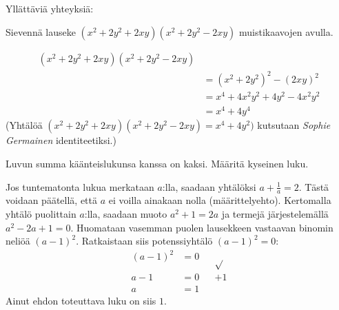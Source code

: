 \begin{tehtavasivu}
\begin{tehtava} 
	Yllättäviä yhteyksiä:

    \begin{vastaus}
    \end{vastaus}
\end{tehtava}

\begin{tehtava}
Sievennä lauseke $(x^2+2y^2+2xy)(x^2+2y^2-2xy)$ muistikaavojen avulla.
	\begin{vastaus}
	\begin{align*}
		(x^2+2y^2+2xy)(x^2+2y^2-2xy) \\
		&=(x^2+2y^2)^2-(2xy)^2 \\
		&=x^4+4x^2y^2+4y^2-4x^2y^2 \\
		&=x^4+4y^4
	\end{align*}		
	(Yhtälöä $(x^2+2y^2+2xy)(x^2+2y^2-2xy)=x^4+4y^2)$ kutsutaan \textit{Sophie Germainen} identiteetiksi.)
	\end{vastaus}
\end{tehtava}

\begin{tehtava}
Luvun summa käänteislukunsa kanssa on kaksi. Määritä kyseinen luku.
	\begin{vastaus}
	Jos tuntematonta lukua merkataan $a$:lla, saadaan yhtälöksi $a+\frac{1}{a}=2$. Tästä voidaan päätellä, että $a$ ei voilla ainakaan nolla (määrittelyehto). Kertomalla yhtälö puolittain $a$:lla, saadaan muoto $a^2+1=2a$ ja termejä järjestelemällä $a^2-2a+1=0$. Huomataan vasemman puolen lausekkeen vastaavan binomin neliöä $(a-1)^2$. Ratkaistaan siis potenssiyhtälö $(a-1)^2=0$:
	\begin{align*}
(a-1)^2&=0 &&\sqrt{ } \\
a-1&=0 &&+1 \\
a&=1 &&
	\end{align*}
	Ainut ehdon toteuttava luku on siis $1$.
	\end{vastaus}
\end{tehtava}


\end{tehtavasivu}
